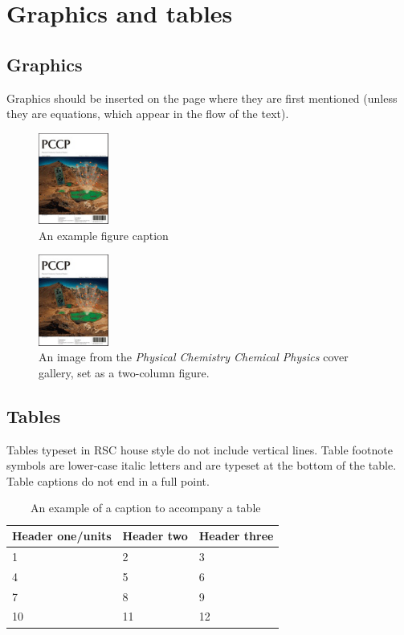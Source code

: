 \documentclass[twoside,twocolumn,9pt]{article}
\begin{document}
\section{Graphics and tables}
\subsection{Graphics}
Graphics should be inserted on the page where they are first mentioned (unless they are equations, which appear in the flow of the text).\cite{Cotton1999}

\begin{figure}[h]
\centering
  \includegraphics[height=3cm]{example}
  \caption{An example figure caption}
  \label{fgr:example}
\end{figure}

\begin{figure}
 \centering
 \includegraphics[height=3cm]{example2}
 \caption{An image from the \textit{Physical Chemistry Chemical Physics} cover gallery, set as a two-column figure.}
 \label{fgr:example2col}
\end{figure}

\subsection{Tables}
Tables typeset in RSC house style do not include vertical lines. Table footnote symbols are lower-case italic letters and are typeset at the bottom of the table. Table captions do not end in a full point.\cite{Arduengo1992,Eisenstein2005}


\begin{table}[h]
\small
  \caption{\ An example of a caption to accompany a table}
  \label{tbl:example}
  \begin{tabular*}{0.5\textwidth}{@{\extracolsep{\fill}}lll}
    \hline
    Header one/units & Header two & Header three \\
    \hline
    1 & 2 & 3 \\
    4 & 5 & 6 \\
    7 & 8 & 9 \\
    10 & 11 & 12 \\
    \hline
  \end{tabular*}
\end{table}
\end{document}
